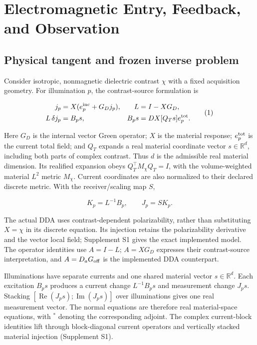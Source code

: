 \section{Electromagnetic Entry, Feedback, and Observation}

\subsection{Physical tangent and frozen inverse problem}

Consider isotropic, nonmagnetic dielectric contrast \(\chi\) with a fixed acquisition geometry. For illumination \(p\), the contrast-source formulation is

\[
\begin{aligned}
j_p&=X(e_p^{\rm inc}+G_Dj_p),&
L&=I-XG_D,\\
L\,\delta j_p&=B_ps,&
B_ps&=DX[Q_Ts]e_p^{\rm tot}.
\end{aligned}\tag{1}
\]

Here \(G_D\) is the internal vector Green operator; \(X\) is the material response; \(e_p^{\rm tot}\) is the current total field; and \(Q_T\) expands a real material coordinate vector \(s\in\mathbb R^d\), including both parts of complex contrast. Thus \(d\) is the admissible real material dimension. Its realified expansion obeys \(Q_T^\top M_\chi Q_T=I\), with the volume-weighted material \(L^2\) metric \(M_\chi\). Current coordinates are also normalized to their declared discrete metric. With the receiver/scaling map \(S\),

\[
K_p=L^{-1}B_p,\qquad J_p=SK_p. \tag{2}
\]

The actual DDA uses contrast-dependent polarizability, rather than substituting \(X=\chi\) in its discrete equation. Its injection retains the polarizability derivative and the vector local field; Supplement S1 gives the exact implemented model. The operator identities use \(A=I-L\); \(A=XG_D\) expresses their contrast-source interpretation, and \(A=D_aG_{\rm off}\) is the implemented DDA counterpart.

Illuminations have separate currents and one shared material vector $s\in\mathbb R^d$. Each excitation $B_ps$ produces a current change $L^{-1}B_ps$ and measurement change $J_ps$. Stacking $[\operatorname{Re}(J_ps);\operatorname{Im}(J_ps)]$ over illuminations gives one real measurement vector. The normal equations are therefore real material-space equations, with $^*$ denoting the corresponding adjoint. The complex current-block identities lift through block-diagonal current operators and vertically stacked material injection (Supplement S1).

